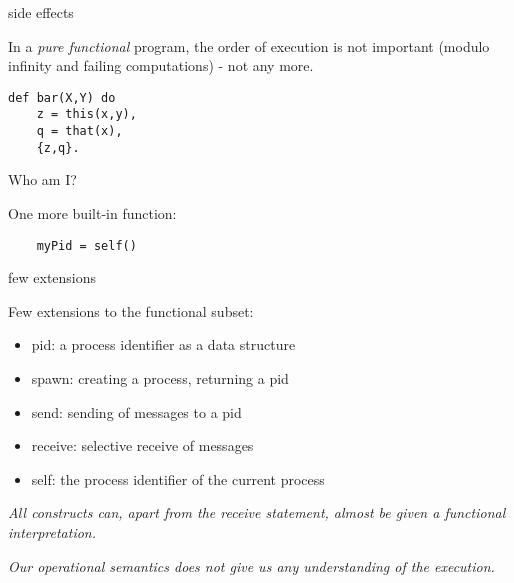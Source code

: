 \begin{frame}[fragile]{side effects}

  In a {\em pure functional} program, the order of execution is not
  important (modulo infinity and failing computations) \pause - not any more.

\pause\vspace{10pt}
\begin{verbatim}
def bar(X,Y) do
    z = this(x,y),
    q = that(x),
    {z,q}.
\end{verbatim}


\end{frame}

 
\begin{frame}[fragile]{Who am I?}

One more built-in function:

\pause\vspace{10pt}

\begin{verbatim}
    myPid = self()
\end{verbatim}

\end{frame}

\begin{frame}{few extensions}

Few extensions to the functional subset:
\pause\vspace{10pt}
\begin{itemize}
\pause\item pid: a process identifier as a data structure
\pause\item spawn: creating a process, returning a pid
\pause\item send: sending of messages to a pid
\pause\item receive: selective receive of messages
\pause\item self: the process identifier of the current process
\end{itemize}

\pause\vspace{10pt}
{\em All constructs can, apart from the receive statement, almost be given a functional interpretation.}

\pause\vspace{10pt}
{\em Our operational semantics does not give us any understanding of the execution.}

\end{frame}

